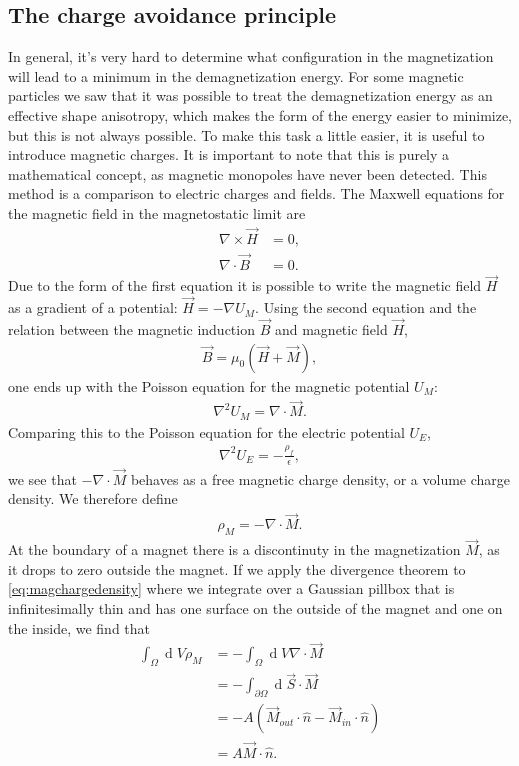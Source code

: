 \documentclass[12pt, a4paper, twoside, openright]{article}		%
\renewcommand{\d}[1]{\ensuremath{\operatorname{d}\!{#1}}}
\numberwithin{equation}{section}
\begin{document}
\subsection{The charge avoidance principle}
In general, it's very hard to determine what configuration in the magnetization will lead to a minimum in the demagnetization energy. For some magnetic particles we saw that it was possible to treat the demagnetization energy as an effective shape anisotropy, which makes the form of the energy easier to minimize, but this is not always possible. To make this task a little easier, it is useful to introduce magnetic charges. It is important to note that this is purely a mathematical concept, as magnetic monopoles have never been detected. This method is a comparison to electric charges and fields. The Maxwell equations for the magnetic field in the magnetostatic limit are
\begin{align}
\nabla \times \vec{H} &= 0, \\
\nabla \cdot \vec{B} &= 0.
\end{align}
Due to the form of the first equation it is possible to write the magnetic field $\vec{H}$ as a gradient of a potential: $\vec{H} = -\nabla U_M$. Using the second equation and the relation between the magnetic induction $\vec{B}$ and magnetic field $\vec{H}$, 
\begin{align}
\vec{B} = \mu_0(\vec{H}+\vec{M}),
\end{align}
one ends up with the Poisson equation for the magnetic potential $U_M$:
\begin{align}
\nabla^2 U_M = \nabla \cdot \vec{M}.
\end{align}
Comparing this to the Poisson equation for the electric potential $U_E$,
\begin{align}
\nabla^2 U_E = -\frac{\rho_f}{\epsilon},
\end{align}
we see that $-\nabla \cdot \vec{M}$ behaves as a free magnetic charge density, or a volume charge density. We therefore define
\begin{align}
\label{eq:magchargedensity}
\rho_M = - \nabla \cdot \vec{M}.
\end{align}
At the boundary of a magnet there is a discontinuty in the magnetization $\vec{M}$, as it drops to zero outside the magnet. If we apply the divergence theorem to \eqref{eq:magchargedensity} where we integrate over a Gaussian pillbox that is infinitesimally thin and has one surface on the outside of the magnet and one on the inside, we find that
\begin{align*}
\int_{\Omega} \d V \rho_M  &= -\int_{\Omega} \d V \nabla \cdot \vec{M} \\
&= -\int_{\partial \Omega} \d {\vec{S}}\cdot\vec{M} \\
&= -A(\vec{M}_{out}\cdot\hat{n} - \vec{M}_{in} \cdot \hat{n}) \\
&= A \vec{M} \cdot\hat{n}.
\end{align*}
\end{document}
